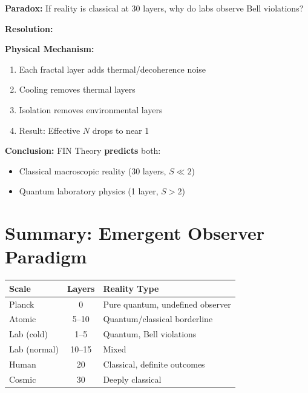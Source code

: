 \documentclass[11pt,a4paper]{book}
\theoremstyle{remark}
\begin{document}
\textbf{Paradox:} If reality is classical at 30 layers, why do labs observe Bell violations?

\textbf{Resolution:}

\begin{center}
\end{center}

\textbf{Physical Mechanism:}
\begin{enumerate}
    \item Each fractal layer adds thermal/decoherence noise
    \item Cooling removes thermal layers
    \item Isolation removes environmental layers
    \item Result: Effective $N$ drops to near 1
\end{enumerate}

\textbf{Conclusion:} FIN Theory \textbf{predicts} both:
\begin{itemize}
    \item Classical macroscopic reality (30 layers, $S \ll 2$)
    \item Quantum laboratory physics (1 layer, $S > 2$)
\end{itemize}

\section{Summary: Emergent Observer Paradigm}

\begin{center}
\begin{tabular}{|l|c|l|}
\hline
\textbf{Scale} & \textbf{Layers} & \textbf{Reality Type} \\
\hline
Planck & 0 & Pure quantum, undefined observer \\
Atomic & 5--10 & Quantum/classical borderline \\
Lab (cold) & 1--5 & Quantum, Bell violations \\
Lab (normal) & 10--15 & Mixed \\
Human & 20 & Classical, definite outcomes \\
Cosmic & 30 & Deeply classical \\
\hline
\end{tabular}
\end{center}
\end{document}
